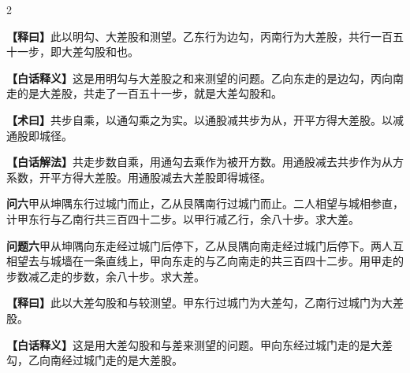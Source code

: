 \documentclass[11pt,a4paper]{article}
\newcommand{\WenQuestion}[1]{\textbf{\textcolor{classicalcolor}{#1}}}
\newcommand{\BaiQuestion}[1]{\textbf{\textcolor{moderncolor}{#1}}}
\newcommand{\WenExplain}{\textcolor{classicalcolor}{\textbf{【释曰】}}}
\newcommand{\BaiExplain}{\textcolor{moderncolor}{\textbf{【白话释义】}}}
\newcommand{\WenMethod}{\textcolor{classicalcolor}{\textbf{【术曰】}}}
\newcommand{\BaiMethod}{\textcolor{moderncolor}{\textbf{【白话解法】}}}
\begin{document}
\begin{paracol}{2}
\switchcolumn*
\begin{tcolorbox}[colback=red!5,colframe=red!30!black,boxrule=0.3pt]
\WenExplain\quad 此以明勾、大差股和测望。乙东行为边勾，丙南行为大差股，共行一百五十一步，即大差勾股和也。
\end{tcolorbox}
\switchcolumn
\begin{tcolorbox}[colback=blue!5,colframe=blue!30!black,boxrule=0.3pt]
\BaiExplain\quad 这是用明勾与大差股之和来测望的问题。乙向东走的是边勾，丙向南走的是大差股，共走了一百五十一步，就是大差勾股和。
\end{tcolorbox}

\switchcolumn*
\begin{tcolorbox}[colback=red!5,colframe=red!40!black,boxrule=0.3pt]
\WenMethod\quad 共步自乘，以通勾乘之为实。以通股减共步为从，开平方得大差股。以减通股即城径。
\end{tcolorbox}
\switchcolumn
\begin{tcolorbox}[colback=blue!5,colframe=blue!40!black,boxrule=0.3pt]
\BaiMethod\quad 共走步数自乘，用通勾去乘作为被开方数。用通股减去共步作为从方系数，开平方得大差股。用通股减去大差股即得城径。
\end{tcolorbox}

\vspace{0.8em}

\switchcolumn*
\begin{tcolorbox}[colback=red!3,colframe=red!30!black,boxrule=0.3pt]
\WenQuestion{问六}\quad 甲从坤隅东行过城门而止，乙从艮隅南行过城门而止。二人相望与城相参直，计甲东行与乙南行共三百四十二步。以甲行减乙行，余八十步。求大差。
\end{tcolorbox}
\switchcolumn
\begin{tcolorbox}[colback=blue!3,colframe=blue!30!black,boxrule=0.3pt]
\BaiQuestion{问题六}\quad 甲从坤隅向东走经过城门后停下，乙从艮隅向南走经过城门后停下。两人互相望去与城墙在一条直线上，甲向东走的与乙向南走的共三百四十二步。用甲走的步数减乙走的步数，余八十步。求大差。
\end{tcolorbox}

\switchcolumn*
\begin{tcolorbox}[colback=red!5,colframe=red!30!black,boxrule=0.3pt]
\WenExplain\quad 此以大差勾股和与较测望。甲东行过城门为大差勾，乙南行过城门为大差股。
\end{tcolorbox}
\switchcolumn
\begin{tcolorbox}[colback=blue!5,colframe=blue!30!black,boxrule=0.3pt]
\BaiExplain\quad 这是用大差勾股和与差来测望的问题。甲向东经过城门走的是大差勾，乙向南经过城门走的是大差股。
\end{tcolorbox}


\end{paracol}
\end{document}
